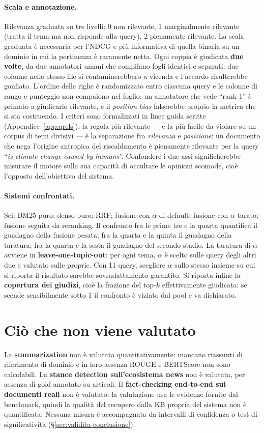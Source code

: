 \documentclass[11pt,a4paper]{report}
\begin{document}
\paragraph{Scala e annotazione.} Rilevanza graduata su tre livelli: $0$ non rilevante, $1$
marginalmente rilevante (tratta il tema ma non risponde alla query), $2$ pienamente rilevante. La
scala graduata è necessaria per l'NDCG e più informativa di quella binaria su un dominio in cui la
pertinenza è raramente netta. Ogni coppia è giudicata \textbf{due volte}, da due annotatori umani
che compilano fogli identici e separati: due colonne nello stesso file si contaminerebbero a
vicenda e l'accordo risulterebbe gonfiato. L'ordine delle righe è randomizzato entro ciascuna query e le colonne
di rango e punteggio non compaiono nel foglio: un annotatore che vede ``rank 1'' è primato a
giudicarlo rilevante, e il \emph{position bias} falserebbe proprio la metrica che si sta
costruendo. I criteri sono formalizzati in linee guida scritte
(Appendice~\ref{app:qrels}); la regola più rilevante --- e la più facile da violare su un corpus di
temi divisivi --- è la separazione fra \emph{rilevanza} e \emph{posizione}: un documento che nega
l'origine antropica del riscaldamento è pienamente rilevante per la query ``\emph{is climate change
caused by humans}''. Confondere i due assi significherebbe misurare il motore sulla sua capacità di
occultare le opinioni scomode, cioè l'opposto dell'obiettivo del sistema.

\paragraph{Sistemi confrontati.} Sei: BM25 puro; denso puro; RRF; fusione con $\alpha$ di default;
fusione con $\alpha$ tarato; fusione seguita da reranking. Il confronto fra le prime tre e la
quarta quantifica il guadagno della fusione pesata; fra la quarta e la quinta il guadagno della
taratura; fra la quarta e la sesta il guadagno del secondo stadio. La taratura di $\alpha$ avviene
in \textbf{leave-one-topic-out}: per ogni tema, $\alpha$ è scelto sulle query degli altri due e
valutato sulle proprie. Con 11 query, scegliere $\alpha$ sullo stesso insieme su cui si riporta il
risultato sarebbe sovradattamento garantito. Si riporta infine la \textbf{copertura dei giudizi},
cioè la frazione del top-$k$ effettivamente giudicata: se scende sensibilmente sotto 1 il confronto
è viziato dal pool e va dichiarato.

\section{Ciò che non viene valutato}
La \textbf{summarization} non è valutata quantitativamente: mancano riassunti di riferimento di
dominio e in loro assenza ROUGE e BERTScore non sono calcolabili. La \textbf{stance detection
sull'ecosistema news} non è valutata, per assenza di gold annotato su articoli. Il
\textbf{fact-checking end-to-end sui documenti reali} non è valutato: la valutazione usa le
evidenze fornite dal benchmark, quindi la qualità del recupero dalla KB propria del sistema non è
quantificata. Nessuna misura è accompagnata da intervalli di confidenza o test di significatività
(\S\ref{sec:validita-conclusione}).
\end{document}
